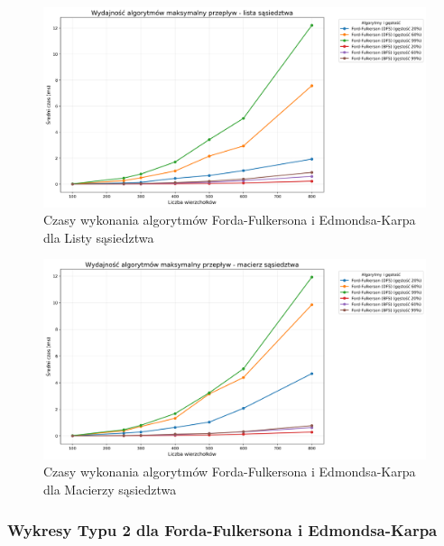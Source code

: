 \documentclass{article}
\begin{document}
\begin{figure}[H]
    \centering
    \includegraphics[scale=0.4]{../Python/charts_type1/Typ1_MAX_FLOW_AdjacencyList_wykres.png}
    \caption{Czasy wykonania algorytmów Forda-Fulkersona i Edmondsa-Karpa dla Listy sąsiedztwa}
\end{figure}
\begin{figure}[H]
    \centering
    \includegraphics[scale=0.4]{../Python/charts_type1/Typ1_MAX_FLOW_AdjacencyMatrix_wykres.png}
    \caption{Czasy wykonania algorytmów Forda-Fulkersona i Edmondsa-Karpa dla Macierzy sąsiedztwa}
\end{figure}

\subsubsection{Wykresy Typu 2 dla Forda-Fulkersona i Edmondsa-Karpa}
\end{document}
